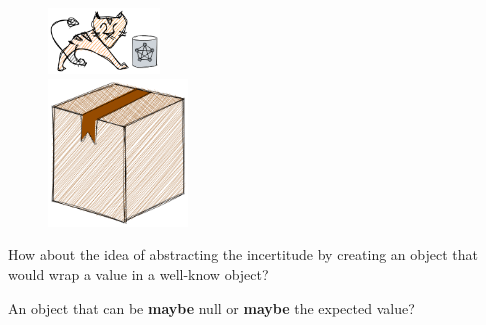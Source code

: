\begin{frame}
    \begin{figure}
        \begin{overprint}
            \begin{center}
                \includegraphics[width=8em]{src/session/functional/resources/cat.png}
            \end{center}
            \begin{center}
                \includegraphics[width=10em]{src/session/functional/resources/box.png}
            \end{center}
        \end{overprint}
    \end{figure}

    \pause
    \pause

    How about the idea of abstracting the incertitude by creating an object that
    would wrap a value in a well-know object?\\

    \pause

    \vspace{1em}
    An object that can be \textbf{maybe} null or \textbf{maybe} the expected
    value?
\end{frame}

\begin{frame}
    
\end{frame}

\begin{frame}
    
\end{frame}

\begin{frame}
    
\end{frame}

